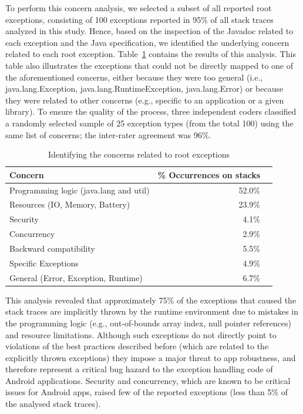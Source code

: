 To perform this concern analysis, we selected a subset of all reported
root exceptions, consisting of 100 exceptions
reported in 95\% of all stack traces analyzed in this study. Hence, based on the inspection of the
Javadoc related to each exception and the Java specification, we
identified the underlying concern related to each root exception.
Table~\ref{tab:tophundrend} contains the results of this analysis. This table also illustrates the exceptions
that could not be directly mapped to one of the aforementioned concerns, either because they were too general (i.e., java.lang.Exception,
java.lang.RuntimeException, java.lang.Error) or because they were
related to other concerns (e.g., specific to an application or a given library).
To ensure the quality of the process, three independent coders classified a randomly selected
sample of 25 exception types (from the total 100) using the same list of concerns;
the inter-rater agreement was 96\%.

\begin{table}
\scriptsize
\centering
\begin{tabular}{lrr}
\hline
\bfseries{Concern} & \bfseries{\% Occurrences on stacks} \\
\hline
Programming logic (java.lang and util) & 52.0\%\\
Resources (IO, Memory, Battery) & 23.9\% \\
Security & 4.1\%\\
Concurrency & 2.9\% \\
Backward compatibility & 5.5\% \\
Specific Exceptions & 4.9\%\\
General (Error, Exception, Runtime) & 6.7\%\\
\hline
\end{tabular}
\caption{Identifying the concerns related to root exceptions}
\label{tab:tophundrend}
\end{table}

This analysis revealed that approximately 75\% of the exceptions
 that caused the stack traces are implicitly thrown by the runtime
environment  due to mistakes in the programming logic (e.g., out-of-bounds array index, null pointer
references) and resource limitations. Although such exceptions do not directly point to violations of
the best practices described before (which are related to the
explicitly thrown exceptions) they impose a major threat to app robustness,
and therefore represent a critical bug hazard to the exception
handling code of Android applications.
Security and concurrency, which are known to be critical issues for Android apps,
raised few of the reported exceptions (less than 5\% of the analysed stack traces).

